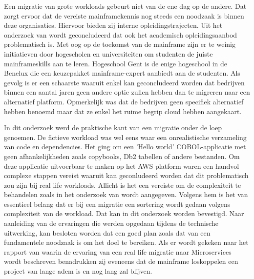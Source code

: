 Een migratie van grote workloads gebeurt niet van de ene dag op de andere. Dat zorgt ervoor dat de vereiste mainframekennis nog steeds een noodzaak is binnen deze organisaties. Hiervoor bieden zij interne opleidingstrajecten. Uit het onderzoek van \textcite{2020} wordt geconcludeerd dat ook het academisch opleidingsaanbod problematisch is. Met oog op de toekomst van de mainframe zijn er te weinig initiatieven door hogescholen en universiteiten om studenten de juiste mainframeskills aan te leren. Hogeschool Gent is de enige hogeschool in de Benelux die een keuzepakket mainframe-expert aanbiedt aan de studenten. Als gevolg is er een schaarste waaruit enkel kan geconcludeerd worden dat bedrijven binnen een aantal jaren geen andere optie zullen hebben dan te migreren naar een alternatief platform. Opmerkelijk was dat de bedrijven geen specifiek alternatief hebben benoemd maar dat ze enkel het ruime begrip cloud hebben aangekaart. 

In dit onderzoek werd de praktische kant van een migratie onder de loep genoemen. De fictieve workload was wel eens waar een onrealistische verzameling van code en dependencies. Het ging om een 'Hello world' COBOL-applicatie met geen afhankelijkheden zoals copybooks, Db2 tabellen of andere bestanden. Om deze applicatie uitvoerbaar te maken op het AWS platform waren een handvol complexe stappen vereist waaruit kan geconludeerd worden dat dit problematisch zou zijn bij real life workloads. Allicht is het een vereiste om de complexiteit te behandelen zoals in het onderzoek van \textcite{Orban2016} wordt aangegeven. Volgens hem is het van essentieel belang dat er bij een migratie een sortering wordt gedaan volgens complexiteit van de workload. Dat kan in dit onderzoek worden bevestigd. Naar aanleiding van de ervaringen die werden opgedaan tijdens de technische uitwerking, kan besloten worden dat een goed plan zoals dat van \textcite{Marble2017} een fundamentele noodzaak is om het doel te bereiken. Als er wordt gekeken naar het rapport van \textcite{Bucchiarone2018} waarin de ervaring van een real life migratie naar Microservices wordt beschreven benadrukken zij eveneens dat de mainframe loskoppelen een project van lange adem is en nog lang zal blijven. 

